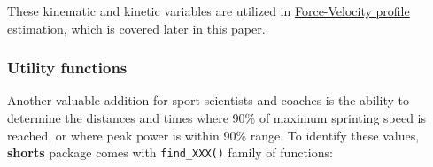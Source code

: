 \documentclass[fleqn,10pt]{wlpeerj} %
\begin{document}
These kinematic and kinetic variables are utilized in \protect\hyperlink{force-velocity-profile}{Force-Velocity profile} estimation, which is covered later in this paper.

\hypertarget{utility-functions}{%
\subsubsection{Utility functions}\label{utility-functions}}

Another valuable addition for sport scientists and coaches is the ability to determine the distances and times where 90\% of maximum sprinting speed is reached, or where peak power is within 90\% range. To identify these values, \textbf{shorts} package comes with \texttt{find\_XXX()} family of functions:

\small
\end{document}
